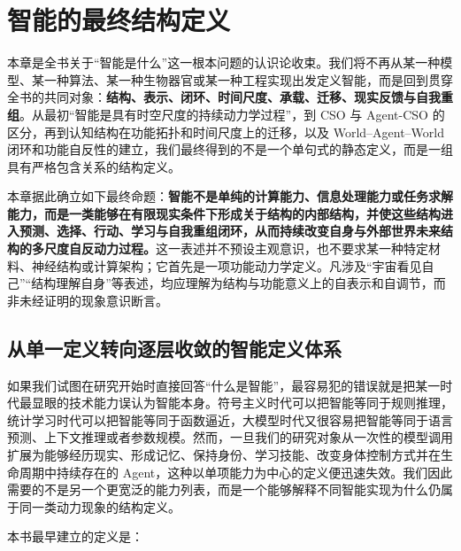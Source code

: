 \chapter{智能的最终结构定义}
\label{chap:intelligence-final-structural-definition}

\begin{chapterlead}
本章是全书关于“智能是什么”这一根本问题的认识论收束。我们将不再从某一种模型、某一种算法、某一种生物器官或某一种工程实现出发定义智能，而是回到贯穿全书的共同对象：\textbf{结构、表示、闭环、时间尺度、承载、迁移、现实反馈与自我重组}。从最初“智能是具有时空尺度的持续动力学过程”，到 CSO 与 Agent-CSO 的区分，再到认知结构在功能拓扑和时间尺度上的迁移，以及 World--Agent--World 闭环和功能自反性的建立，我们最终得到的不是一个单句式的静态定义，而是一组具有严格包含关系的结构定义。

本章据此确立如下最终命题：\textbf{智能不是单纯的计算能力、信息处理能力或任务求解能力，而是一类能够在有限现实条件下形成关于结构的内部结构，并使这些结构进入预测、选择、行动、学习与自我重组闭环，从而持续改变自身与外部世界未来结构的多尺度自反动力过程。}这一表述并不预设主观意识，也不要求某一种特定材料、神经结构或计算架构；它首先是一项功能动力学定义。凡涉及“宇宙看见自己”“结构理解自身”等表述，均应理解为结构与功能意义上的自表示和自调节，而非未经证明的现象意识断言。
\end{chapterlead}



\section{从单一定义转向逐层收敛的智能定义体系}

如果我们试图在研究开始时直接回答“什么是智能”，最容易犯的错误就是把某一时代最显眼的技术能力误认为智能本身。符号主义时代可以把智能等同于规则推理，统计学习时代可以把智能等同于函数逼近，大模型时代又很容易把智能等同于语言预测、上下文推理或者参数规模。然而，一旦我们的研究对象从一次性的模型调用扩展为能够经历现实、形成记忆、保持身份、学习技能、改变身体控制方式并在生命周期中持续存在的 Agent，这种以单项能力为中心的定义便迅速失效。我们因此需要的不是另一个更宽泛的能力列表，而是一个能够解释不同智能实现为什么仍属于同一类动力现象的结构定义。

本书最早建立的定义是：

\begin{statementbox}
\centering
{}
\end{statementbox}

